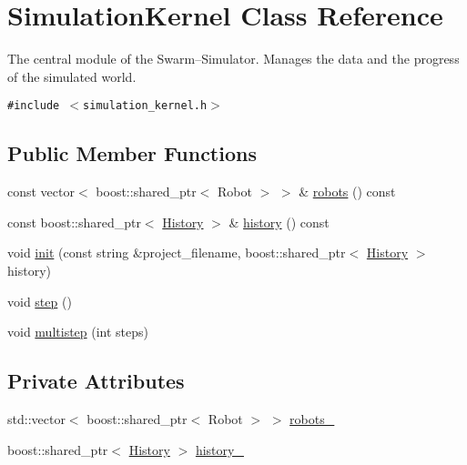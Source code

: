 \hypertarget{class_simulation_kernel}{
\section{SimulationKernel Class Reference}
\label{class_simulation_kernel}
}
The central module of the Swarm–Simulator. Manages the data and the progress of the simulated world.  


{\tt \#include $<$simulation\_\-kernel.h$>$}

\subsection*{Public Member Functions}
\begin{CompactItemize}
\item 
const vector$<$ boost::shared\_\-ptr$<$ Robot $>$ $>$ \& \hyperlink{class_simulation_kernel_33dcfe76bf0c0e0cf980c7a6ccdd817b}{robots} () const 
\item 
const boost::shared\_\-ptr$<$ \hyperlink{class_history}{History} $>$ \& \hyperlink{class_simulation_kernel_70346340fc146d8582723ee05ee54f33}{history} () const 
\item 
void \hyperlink{class_simulation_kernel_c6990f8bb4b86d3b04cb02e5581bc3e1}{init} (const string \&project\_\-filename, boost::shared\_\-ptr$<$ \hyperlink{class_history}{History} $>$ history)
\item 
void \hyperlink{class_simulation_kernel_b1d2477386ccc99d784f1d4fce87691d}{step} ()
\item 
void \hyperlink{class_simulation_kernel_77c22f17fdbea282e373bb1a0e373918}{multistep} (int steps)
\end{CompactItemize}
\subsection*{Private Attributes}
\begin{CompactItemize}
\item 
std::vector$<$ boost::shared\_\-ptr$<$ Robot $>$ $>$ \hyperlink{class_simulation_kernel_3f66cf6d56a17d864955a771086292ea}{robots\_\-}
\item 
boost::shared\_\-ptr$<$ \hyperlink{class_history}{History} $>$ \hyperlink{class_simulation_kernel_197d4dccd403ae6bd8f636a458c8b58d}{history\_\-}
\end{CompactItemize}

